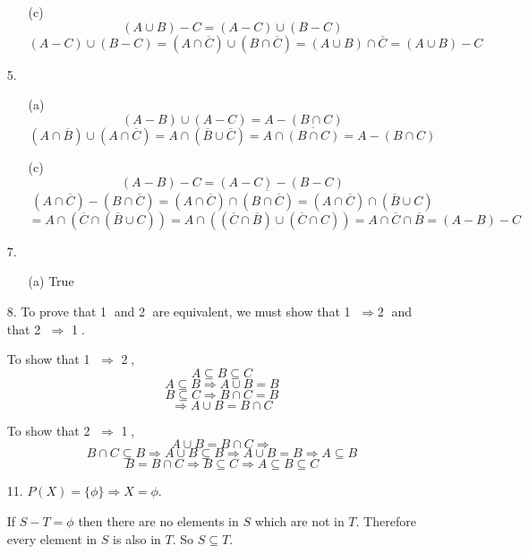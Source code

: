 \documentclass{article}
\begin{document}
\begin{enumerate}
\begin{enumerate}
			\item[(c)]
				\[(A \cup B)-C = (A-C) \cup (B-C)\]
				\[(A-C) \cup (B-C) = (A \cap \overline{C}) \cup (B \cap \overline{C}) = (A \cup B) \cap \overline{C} = (A \cup B) - C\]
		\end{enumerate}
		
	\item[5.]
		\begin{enumerate}
			\item[(a)]
				\[(A-B) \cup (A-C) = A - (B \cap C)\]
				\[(A \cap \overline{B}) \cup (A \cap \overline{C}) = A \cap (\overline{B} \cup \overline{C}) = A \cap \overline{(B \cap C)} = A - (B \cap C)\]
			
			\item[(c)]
				\[(A-B)-C = (A-C)-(B-C)\]
				\[(A \cap \overline{C})-(B \cap \overline{C}) = (A \cap \overline{C}) \cap \overline{(B \cap \overline{C})} = (A \cap \overline{C}) \cap (\overline{B} \cup C)\]
				\[= A \cap (\overline{C} \cap (\overline{B} \cup C)) = A \cap ((\overline{C} \cap \overline{B})\cup (\overline{C} \cap C)) = A \cap \overline{C} \cap \overline{B} = (A-B)-C\]
		\end{enumerate}
		
	\item[7.]
		\begin{enumerate}
			\item[(a)]
				True
		\end{enumerate}
	
	\item[8.]
		To prove that \textcircled{1} and \textcircled{2} are equivalent, we must show that \textcircled{1} \(\Rightarrow\)\textcircled{2}  and that \textcircled{2} \(\Rightarrow\) \textcircled{1}. 
	
		\medbreak
		To show that \textcircled{1} \(\Rightarrow\) \textcircled{2},
		\[A \subseteq B \subseteq C\]
		\[A \subseteq B \Rightarrow A \cup B = B\]
		\[B \subseteq C \Rightarrow B \cap C = B\]
		\[\Rightarrow A \cup B = B \cap C\]

		\medbreak
		To show that \textcircled{2} \(\Rightarrow\) \textcircled{1},
		\[A \cup B = B \cap C \Rightarrow\]
		\[B \cap C \subseteq B \Rightarrow A \cup B \subseteq B \Rightarrow A \cup B = B \Rightarrow A \subseteq B\]
		\[B = B \cap C \Rightarrow B \subseteq C \Rightarrow A \subseteq B \subseteq C\]

	\item[11.]
		\(P(X) = \{\phi\} \Rightarrow X = \phi \). 
		
		\medbreak
		If \(S-T = \phi\) then there are no elements in \(S\) which are not in \(T \). Therefore every element in \(S\) is also in \(T \). So \(S \subseteq T \).
		

\end{enumerate}
\end{document}
